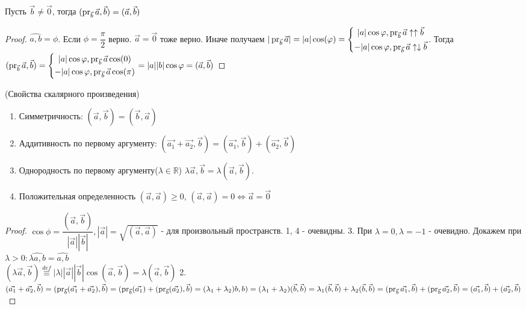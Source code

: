 \begin{proposition}
	Пусть $\vec{b}\ne\vec{0}$, тогда \((\operatorname{pr}_{\vec{b}}\vec{a}, \vec{b}) = (\vec{a}, \vec{b})\)
\end{proposition}
\begin{proof}
	\(\hat{a, b} = \phi\). Если $\phi = \dfrac{\pi}{2}$ верно. $\vec{a} = \vec{0}$ тоже верно. Иначе получаем \(
	|\operatorname{pr}_{\vec{b}}\vec{a}| = |a|\cos(\varphi) = \left\{
	\begin{gathered}
		|a|\cos\varphi, \operatorname{pr}_{\vec{b}}\vec{a} \uparrow\uparrow \vec{b} \\
		-|a|\cos\varphi, \operatorname{pr}_{\vec{b}}\vec{a} \uparrow\downarrow \vec{b} \\
	\end{gathered}
	\right.
	\). Тогда \((\operatorname{pr}_{\vec{b}}\vec{a}, \vec{b}) = \left\{
	\begin{gathered}
		|a|\cos\varphi, \operatorname{pr}_{\vec{b}}\vec{a}\cos(0) \\
		-|a|\cos\varphi, \operatorname{pr}_{\vec{b}}\vec{a}\cos(\pi) \\
	\end{gathered}
	\right. = \\|a||b|\cos\varphi = (\vec{a},\vec{b})\)
\end{proof}
\begin{theorem}
	(Свойства скалярного произведения)
	\begin{enumerate}
		\item Симметричность: \((\vec{a}, \vec{b}) = (\vec{b}, \vec{a})\)
		\item Аддитивность по первому аргументу: \((\vec{a_1}+\vec{a_2}, \vec{b}) = (\vec{a_1}, \vec{b}) + (\vec{a_2}, \vec{b})\)
		\item Однородность по первому аргументу($\lambda\in \mathbb{R}$) \(\lambda \vec{a}, \vec{b} = \lambda (\vec{a}, \vec{b})\).
		\item Положительная определенность \((\vec{a}, \vec{a})\ge 0\), \((\vec{a}, \vec{a})= 0\Longleftrightarrow \vec{a} = \vec{0}\)
	\end{enumerate}
\end{theorem}
\begin{proof}
	\(\cos\phi = \dfrac{(\vec{a}, \vec{b})}{|\vec{a}||\vec{b}|}, |\vec{a}| = \sqrt{(\vec{a}, \vec{a})}\) - для произвольный пространств.
	1, 4 - очевидны.
	3. При $\lambda = 0, \lambda = -1$ - очевидно. Докажем при $\lambda > 0: \hat{\lambda a, b} = \hat{a, b}$ \\
	\((\lambda \vec{a}, \vec{b}) \overset{def}{\equiv}|\lambda||\vec{a}||\vec{b}|\cos(\vec{a}, \vec{b}) = \lambda (\vec{a}, \vec{b})\)
	2. \((\vec{a_1}+\vec{a_2}, \vec{b}) = (\operatorname{pr}_{\vec{b}}(\vec{a_1}+\vec{a_2}), \vec{b}) = (\operatorname{pr}_{\vec{b}}(\vec{a_1})+(\operatorname{pr}_{\vec{b}}(\vec{a_2}), \vec{b}) = (\lambda_1 + \lambda_2)b, b) = (\lambda_1 + \lambda_2)(\vec{b}, \vec{b}) = \lambda_1(\vec{b}, \vec{b}) + \lambda_2(\vec{b}, \vec{b}) = (\operatorname{pr}_{\vec{b}}\vec{a_1}, \vec{b}) + (\operatorname{pr}_{\vec{b}}\vec{a_2}, \vec{b}) = (\vec{a_1}, \vec{b}) + (\vec{a_2}, \vec{b})\)
\end{proof}
